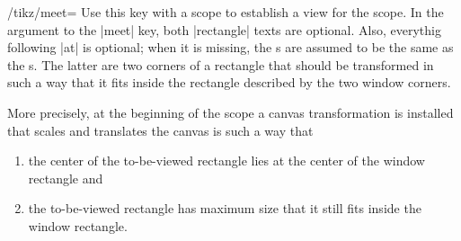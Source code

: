 \begin{key}{/tikz/meet=
      }
  Use this key with a scope to establish a view for the scope. In the
  argument to the |meet| key, both |rectangle| texts are
  optional. Also, everythig following |at| is optional; when it is
  missing, the s are assumed to be the same as the
  s. The latter are two corners of a
  rectangle that should be transformed in such a way that it fits
  inside the rectangle described by the two window corners.

  More precisely, at the beginning of the scope a canvas
  transformation is installed that scales and translates the canvas is
  such a way that
  \begin{enumerate}
  \item the center of the to-be-viewed rectangle lies at the center of
    the window rectangle and
  \item the to-be-viewed rectangle has maximum size that it still fits
    inside the window rectangle.
  \end{enumerate}

\begin{codeexample}[]
\end{codeexample}
\begin{codeexample}[]
\end{codeexample}


\end{key}
